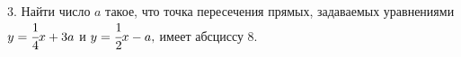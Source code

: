 3. Найти число $a$ такое, что точка пересечения прямых, задаваемых уравнениями \\ $y=\cfrac{1}{4}x+3a$ и $y=\cfrac{1}{2}x-a,$ имеет абсциссу 8.\\
